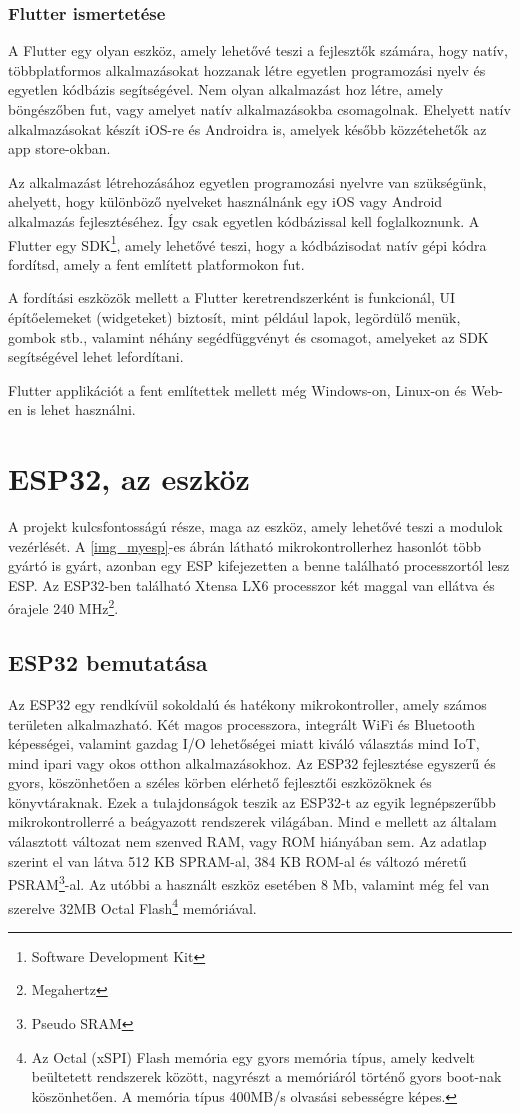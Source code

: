 \documentclass{thesis-ekf}
\theoremstyle{definition}
\theoremstyle{remark}
\begin{document}
	\subsection{Flutter ismertetése}
	A Flutter egy olyan eszköz, amely lehetővé teszi a fejlesztők számára, hogy natív, többplatformos alkalmazásokat hozzanak létre egyetlen programozási nyelv és egyetlen kódbázis segítségével. Nem olyan alkalmazást hoz létre, amely böngészőben fut, vagy amelyet natív alkalmazásokba csomagolnak. Ehelyett natív alkalmazásokat készít iOS-re és Androidra is, amelyek később közzétehetők az app store-okban.
	
	
	Az alkalmazást létrehozásához egyetlen programozási nyelvre van szükségünk, ahelyett, hogy különböző nyelveket használnánk egy iOS vagy Android alkalmazás fejlesztéséhez. Így csak egyetlen kódbázissal kell foglalkoznunk. A Flutter egy SDK\footnote{Software Development Kit}, amely lehetővé teszi, hogy a kódbázisodat natív gépi kódra fordítsd, amely a fent említett platformokon fut.
	
	
	A fordítási eszközök mellett a Flutter keretrendszerként is funkcionál, UI építőelemeket (widgeteket) biztosít, mint például lapok, legördülő menük, gombok stb., valamint néhány segédfüggvényt és csomagot, amelyeket az SDK segítségével lehet lefordítani.\cite{bib_flutter_short}
	
	Flutter applikációt a fent említettek mellett még Windows-on, Linux-on és Web-en is lehet használni.
	\chapter{ESP32, az eszköz}
	\label{ch_esp}
	A projekt kulcsfontosságú része, maga az eszköz, amely lehetővé teszi a modulok vezérlését. A \ref{img_myesp}-es ábrán látható mikrokontrollerhez hasonlót több gyártó is gyárt, azonban egy ESP kifejezetten a benne található processzortól lesz ESP. Az ESP32-ben található Xtensa LX6 processzor két maggal van ellátva és órajele 240 MHz\footnote{Megahertz}.
	\section{ESP32 bemutatása}
	\label{se_espB}
	Az ESP32 egy rendkívül sokoldalú és hatékony mikrokontroller, amely számos területen alkalmazható. Két magos processzora, integrált WiFi és Bluetooth képességei, valamint gazdag I/O lehetőségei miatt kiváló választás mind IoT, mind ipari vagy okos otthon alkalmazásokhoz. Az ESP32 fejlesztése egyszerű és gyors, köszönhetően a széles körben elérhető fejlesztői eszközöknek és könyvtáraknak. Ezek a tulajdonságok teszik az ESP32-t az egyik legnépszerűbb mikrokontrollerré a beágyazott rendszerek világában. Mind e mellett az általam választott változat nem szenved RAM, vagy ROM hiányában sem. Az adatlap szerint el van látva 512 KB SPRAM-al, 384 KB ROM-al és változó méretű PSRAM\footnote{Pseudo SRAM}-al. Az utóbbi a használt eszköz esetében 8 Mb, valamint még fel van szerelve 32MB Octal Flash\footnote{Az Octal (xSPI) Flash memória egy gyors memória típus, amely kedvelt beültetett rendszerek között, nagyrészt a memóriáról történő gyors boot-nak köszönhetően. A memória típus 400MB/s olvasási sebességre képes.\cite{bib_esp_octal}} memóriával.
	
\end{document}

